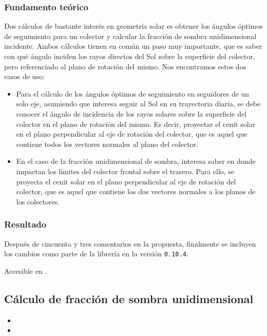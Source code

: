 \subsubsection{Fundamento teórico}

Dos cálculos de bastante interés en geometría solar es obtener los ángulos óptimos de seguimiento  para un colector y calcular la fracción de sombra unidimensional incidente. Ambos cálculos tienen en común un paso muy importante, que es saber con qué ángulo inciden los rayos directos del Sol sobre la superficie del colector, pero referenciado al plano de rotación del mismo. Nos encontramos estos dos casos de uso:

\begin{itemize}
    \item Para el cálculo de los ángulos óptimos de seguimiento en seguidores de un solo eje, asumiendo que interesa seguir al Sol en su trayectoria diaria, se debe conocer el ángulo de incidencia de los rayos solares sobre la superficie del colector en el plano de rotación del mismo. Es decir, proyectar el cenit solar en el plano perpendicular al eje de rotación del colector, que es aquel que contiene todos los vectores normales al plano del colector.
    \item En el caso de la fracción unidimensional de sombra, interesa saber en donde impactan los límites del colector frontal sobre el trasero. Para ello, se proyecta el cenit solar en el plano perpendicular al eje de rotación del colector, que es aquel que contiene los dos vectores normales a los planos de los colectores.
\end{itemize}

\subsubsection{Resultado}

Después de cincuenta y tres comentarios en la propuesta, finalmente se incluyen los cambios como parte de la librería en la versión \texttt{0.10.4}.

Accesible en .

\subsection{Cálculo de fracción de sombra unidimensional} \label{sct:desarrollo:contribuciones_cientificas:fraccion_sombra}

\begin{itemize}
    \item {}
    \item {}
\end{itemize}

